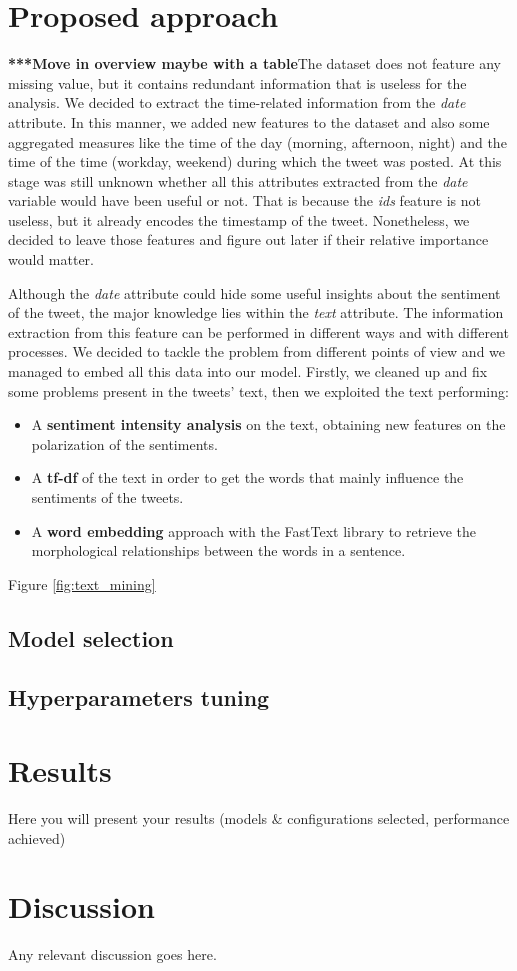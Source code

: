\documentclass[conference]{IEEEtran}
\begin{document}
\section{Proposed approach}\label{sec:approach}
\textbf{***Move in overview maybe with a table}The dataset does not feature any missing value, but it contains redundant information that is useless for the analysis. We decided to extract the time-related information from the \textit{date} attribute. In this manner, we added new features to the dataset and also some aggregated measures like the time of the day (morning, afternoon, night) and the time of the time (workday, weekend) during which the tweet was posted. At this stage was still unknown whether all this attributes extracted from the \textit{date} variable would have been useful or not. That is because the \textit{ids} feature is not useless, but it already encodes the timestamp of the tweet. Nonetheless, we decided to leave those features and figure out later if their relative importance would matter.

Although the \textit{date} attribute could hide some useful insights about the sentiment of the tweet, the major knowledge lies within the \textit{text} attribute. The information extraction from this feature can be performed in different ways and with different processes. We decided to tackle the problem from different points of view and we managed to embed all this data into our model. Firstly, we cleaned up and fix some problems present in the tweets' text, then we exploited the text performing:
\begin{itemize}
    \item A \textbf{sentiment intensity analysis}\cite{} on the text, obtaining new features on the polarization of the sentiments.
    \item A \textbf{tf-df}\cite{} of the text in order to get the words that mainly influence the sentiments of the tweets.
    \item A \textbf{word embedding}\cite{} approach with the FastText\cite{} library to retrieve the morphological relationships between the words in a sentence.
\end{itemize}
Figure \ref{fig:text_mining}
\subsection{Model selection}\label{sec:model}
\subsection{Hyperparameters tuning}\label{sec:hypertuning}

\section{Results}\label{sec:results}
Here you will present your results (models \& configurations selected, performance achieved)

\section{Discussion}\label{sec:discussion}
Any relevant discussion goes here.



\end{document}
